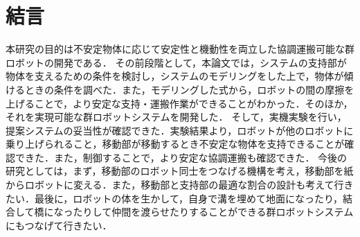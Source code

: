 \chapter{結言}
本研究の目的は不安定物体に応じて安定性と機動性を両立した協調運搬可能な群ロボットの開発である．
その前段階として，本論文では，システムの支持部が物体を支えるための条件を検討し，システムのモデリングをした上で，物体が傾けるときの条件を調べた．また，モデリングした式から，ロボットの間の摩擦を上げることで，より安定な支持・運搬作業ができることがわかった．そのほか，それを実現可能な群ロボットシステムを開発した．
そして，実機実験を行い，提案システムの妥当性が確認できた．実験結果より，ロボットが他のロボットに乗り上げられること，移動部が移動するとき不安定な物体を支持できることが確認できた．また，制御することで，より安定な協調運搬も確認できた．
今後の研究としては，まず，移動部のロボット同士をつなげる機構を考え，移動部を紙からロボットに変える．また，移動部と支持部の最適な割合の設計も考えて行きたい．最後に，ロボットの体を生かして，自身で溝を埋めて地面になったり，結合して橋になったりして仲間を渡らせたりすることができる群ロボットシステムにもつなげて行きたい．


